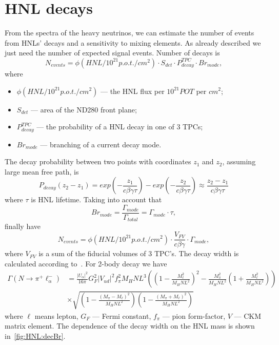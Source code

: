 \documentclass[../main.tex]{subfiles}
\begin{document}
\section{HNL decays}

From the spectra of the heavy neutrinos, we can estimate the number of events from HNLs' decays and a sensitivity to mixing elements. As already described we just need the number of expected signal events. Number of decays is
\begin{equation}
    N_{events}=\phi(HNL/10^{21}p.o.t./cm^2)\cdot S_{det} \cdot P_{decay}^{TPC}\cdot Br_{mode},
    \label{eq:HNL:Nevents}
\end{equation}
where
\begin{itemize}
    \item $\phi(HNL/10^{21}p.o.t./cm^2)$ --- the HNL flux per $10^{21}POT$ per $cm^2$;
    \item $S_{det}$ --- area of the ND280 front plane;
    \item $P_{decay}^{TPC}$ --- the probability of a HNL decay in one of 3 TPCs;
    \item $Br_{mode}$ --- branching of a current decay mode.
\end{itemize}
The decay probability between two points with coordinates $z_1$ and $z_2$, assuming large mean free path, is
\begin{equation}
    P_{decay}(z_2-z_1)=exp(-\frac{z_1}{c\beta\gamma\tau})-exp(-\frac{z_2}{c\beta\gamma\tau})\approx \frac{z_2-z_1}{c\beta\gamma\tau}
    \label{eq:Pdecay}
\end{equation}
where $\tau$ is HNL lifetime. Taking into account that
\begin{equation}
    Br_{mode}=\frac{\Gamma_{mode}}{\Gamma_{total}}=\Gamma_{mode}\cdot\tau,
\end{equation}
finally have
\begin{equation}
    N_{events}=\phi(HNL/10^{21}p.o.t./cm^2)\cdot\frac{V_{FV}}{c\beta\gamma}\cdot\Gamma_{mode},
    \label{eq:HNL:EventsN}
\end{equation}
where $V_{FV}$ is a sum of the fiducial volumes of 3 TPC's. The decay width is calculated according to~\cite{Gorbunov2007, Johnson1997}. For 2-body decay we have
\begin{equation}
    \begin{split}
    \Gamma\left(N\to \pi^+\ell_\alpha^-\right)&=\frac{\left|U_\alpha\right|^2}{16\pi}G_F^2\left|V_{ud}\right|^2f_\pi^2M_HNL^3\left(\left(1-\frac{M_\ell^2}{M_HNL^2}\right)^2-\frac{M_{\pi}^2}{M_HNL^2}\left(1+\frac{M_\ell^2}{M_HNL^2}\right)\right)     \\
    &\times \sqrt{\left(1-\frac{\left(M_{\pi}-M_\ell\right)^2}{M_HNL^2}\right)\left(1-\frac{\left(M_{\pi}+M_\ell\right)^2}{M_HNL^2}\right)}
    \end{split}
\end{equation}
where  $\ell$ means lepton, $G_F$ --- Fermi constant, $f_\pi$ --- pion form-factor, $V$ --- CKM matrix element. The dependence of the decay width on the HNL mass is shown in~\autoref{fig:HNL:decBr}.
\end{document}
